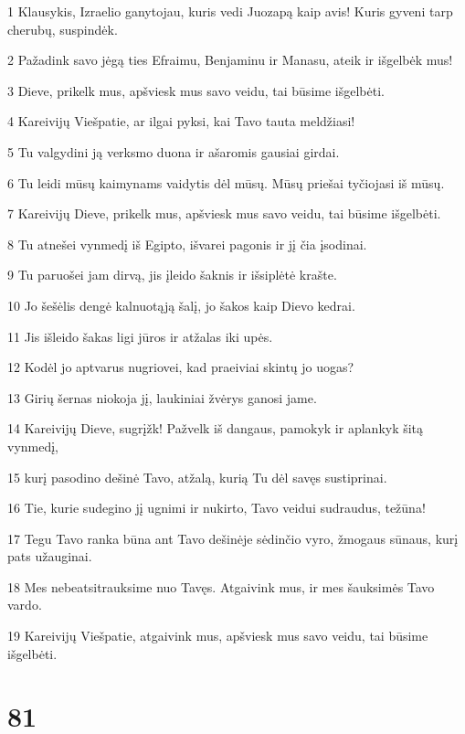 \par 1 Klausykis, Izraelio ganytojau, kuris vedi Juozapą kaip avis! Kuris gyveni tarp cherubų, suspindėk. 
\par 2 Pažadink savo jėgą ties Efraimu, Benjaminu ir Manasu, ateik ir išgelbėk mus! 
\par 3 Dieve, prikelk mus, apšviesk mus savo veidu, tai būsime išgelbėti. 
\par 4 Kareivijų Viešpatie, ar ilgai pyksi, kai Tavo tauta meldžiasi! 
\par 5 Tu valgydini ją verksmo duona ir ašaromis gausiai girdai. 
\par 6 Tu leidi mūsų kaimynams vaidytis dėl mūsų. Mūsų priešai tyčiojasi iš mūsų. 
\par 7 Kareivijų Dieve, prikelk mus, apšviesk mus savo veidu, tai būsime išgelbėti. 
\par 8 Tu atnešei vynmedį iš Egipto, išvarei pagonis ir jį čia įsodinai. 
\par 9 Tu paruošei jam dirvą, jis įleido šaknis ir išsiplėtė krašte. 
\par 10 Jo šešėlis dengė kalnuotąją šalį, jo šakos kaip Dievo kedrai. 
\par 11 Jis išleido šakas ligi jūros ir atžalas iki upės. 
\par 12 Kodėl jo aptvarus nugriovei, kad praeiviai skintų jo uogas? 
\par 13 Girių šernas niokoja jį, laukiniai žvėrys ganosi jame. 
\par 14 Kareivijų Dieve, sugrįžk! Pažvelk iš dangaus, pamokyk ir aplankyk šitą vynmedį, 
\par 15 kurį pasodino dešinė Tavo, atžalą, kurią Tu dėl savęs sustiprinai. 
\par 16 Tie, kurie sudegino jį ugnimi ir nukirto, Tavo veidui sudraudus, težūna! 
\par 17 Tegu Tavo ranka būna ant Tavo dešinėje sėdinčio vyro, žmogaus sūnaus, kurį pats užauginai. 
\par 18 Mes nebeatsitrauksime nuo Tavęs. Atgaivink mus, ir mes šauksimės Tavo vardo. 
\par 19 Kareivijų Viešpatie, atgaivink mus, apšviesk mus savo veidu, tai būsime išgelbėti.


\chapter{81}


